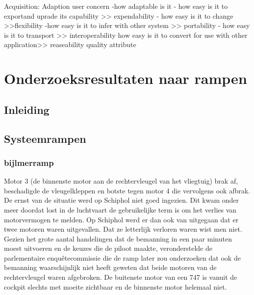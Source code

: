 Acquisition: Adaption
user concern
-how adaptable is it
- how easy is it to exportand uprade its capability >> expendability
- how easy is it to change >>flexibility
-how easy is it to infer with other system >> portability
- how easy is it to transport >> interoperability
how easy is it to convert for use with other application>> reaseability
quality attribute




\section{Onderzoeksresultaten naar rampen}

\subsection{Inleiding}

\subsection{Systeemrampen}
\subsubsection{bijlmerramp}
Motor 3 (de binnenste motor aan de rechtervleugel van het vliegtuig) brak af, beschadigde de vleugelkleppen en botste tegen motor 4 die vervolgens ook afbrak.
De ernst van de situatie werd op Schiphol niet goed ingezien. Dit kwam onder meer doordat lost in de luchtvaart de gebruikelijke term is om het verlies van motorvermogen te melden. Op Schiphol werd er dan ook van uitgegaan dat er twee motoren waren uitgevallen. Dat ze letterlijk verloren waren wist men niet. Gezien het grote aantal handelingen dat de bemanning in een paar minuten moest uitvoeren en de keuzes die de piloot maakte, veronderstelde de parlementaire enquêtecommissie die de ramp later zou onderzoeken dat ook de bemanning waarschijnlijk niet heeft geweten dat beide motoren van de rechtervleugel waren afgebroken. De buitenste motor van een 747 is vanuit de cockpit slechts met moeite zichtbaar en de binnenste motor helemaal niet.

